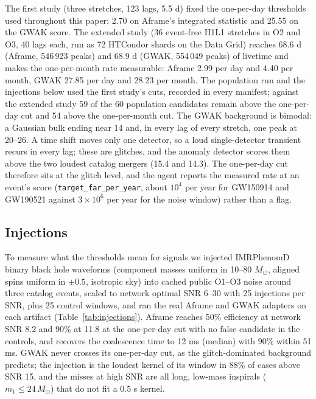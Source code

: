 \documentclass[twocolumn]{aastex631}
\begin{document}
The first study (three stretches, 123 lags, 5.5 d) fixed the one-per-day
thresholds used throughout this paper: 2.70 on Aframe's integrated
statistic and 25.55 on the GWAK score. The extended study (36 event-free
H1L1 stretches in O2 and O3, 40 lags each, run as 72 HTCondor shards on the
Data Grid) reaches 68.6 d (Aframe, 546\,923 peaks) and 68.9 d (GWAK, 554\,049 peaks)
of livetime and makes the one-per-month rate measurable: Aframe 2.99 per
day and 4.40 per month, GWAK 27.85 per day and 28.23 per month. The
population run and the injections below used the first study's cuts,
recorded in every manifest; against the extended study 59 of the 60
population candidates remain above the one-per-day cut and 54 above the
one-per-month cut. The GWAK background is bimodal: a Gaussian
bulk ending near 14 and, in every lag of every stretch, one peak at
20--26. A time shift moves only one detector, so a loud single-detector
transient recurs in every lag; these are glitches, and the anomaly
detector scores them above the two loudest catalog mergers (15.4 and
14.3). The one-per-day cut therefore sits at the glitch level, and the
agent reports the measured rate at an event's score
(\texttt{target\_far\_per\_year}, about $10^4$ per year for GW150914 and
GW190521 against $3\times10^6$ per year for the noise window) rather than
a flag.

\subsection{Injections}
To measure what the thresholds mean for signals we injected IMRPhenomD
binary black hole waveforms (component masses uniform in
10--80 $M_\odot$, aligned spins uniform in $\pm0.5$, isotropic sky) into
cached public O1--O3 noise around three catalog events, scaled to network
optimal SNR 6--30 with 25 injections per SNR, plus 25 control windows, and
ran the real Aframe and GWAK adapters on each artifact
(Table~\ref{tab:injections}). Aframe reaches 50\% efficiency at network
SNR 8.2 and 90\% at 11.8 at the one-per-day cut with no false candidate in
the controls, and recovers the coalescence time to 12 ms (median) with
90\% within 51 ms. GWAK never crosses its one-per-day cut, as the
glitch-dominated background predicts; the injection is the loudest kernel
of its window in 88\% of cases above SNR 15, and the misses at high SNR
are all long, low-mass inspirals ($m_1 \leq 24\,M_\odot$) that do not fit a
0.5 s kernel.
\end{document}
